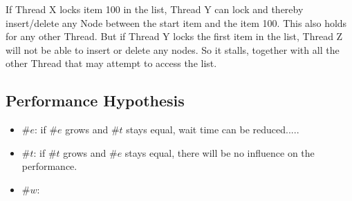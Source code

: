 \documentclass[10pt,a4paper]{article}
\begin{document}
If Thread X locks item 100 in the list, Thread Y can lock and thereby
insert/delete any Node between the start item and the item 100. This
also holds for any other Thread. But if Thread Y locks the first item in the
list, Thread Z will not be able to insert or delete any nodes. So it stalls,
together with all the other Thread that may attempt to access the list.

\subsection{Performance Hypothesis}
\begin{itemize}
 \item $\#e$:  if $\#e$ grows and $\#t$ stays equal, wait time can be
 reduced..... 
 \item $\#t$:  if $\#t$ grows and $\#e$ stays equal, there will be no influence on the performance.
 \item $\#w$:  
\end{itemize}
\end{document}
